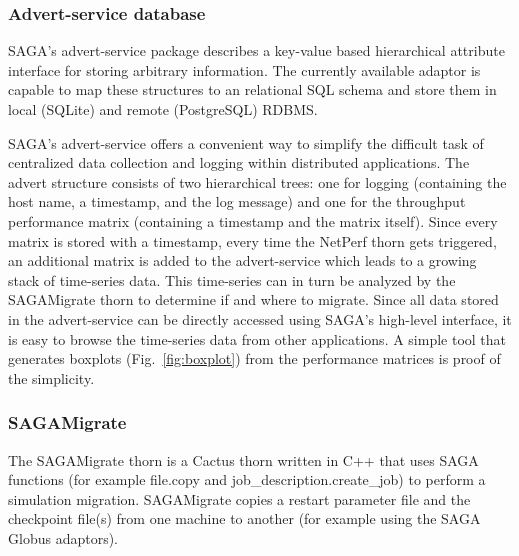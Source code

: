 \documentclass[conference,final]{IEEEtran}
\begin{document}
\subsubsection{Advert-service database} SAGA's advert-service package
describes a key-value based hierarchical attribute interface for
storing arbitrary information. The currently available adaptor is
capable to map these structures to an relational SQL schema and store
them in local (SQLite) and remote (PostgreSQL) RDBMS.

SAGA's advert-service offers a convenient way to simplify the
difficult task of centralized data collection and logging within
distributed applications. The advert structure consists of two
hierarchical trees: one for logging (containing the host name, a
timestamp, and the log message) and one for the throughput performance
matrix (containing a timestamp and the matrix itself). Since every
matrix is stored with a timestamp, every time the NetPerf thorn gets
triggered, an additional matrix is added to the advert-service which
leads to a growing stack of time-series data. This time-series can in
turn be analyzed by the SAGAMigrate thorn to determine if and where
to migrate.  Since all data stored in the advert-service can be
directly accessed using SAGA's high-level interface, it is easy to
browse the time-series data from other applications. A simple tool
that generates boxplots (Fig.~\ref{fig:boxplot}) from the performance
matrices is proof of the simplicity.

\subsubsection{SAGAMigrate} The SAGAMigrate thorn is a Cactus thorn
written in C++ that uses SAGA functions (for example file.copy and
job\_description.create\_job) to perform a simulation migration.
SAGAMigrate copies a restart parameter file and the checkpoint file(s)
from one machine to another (for example using the SAGA Globus
adaptors).
\end{document}
